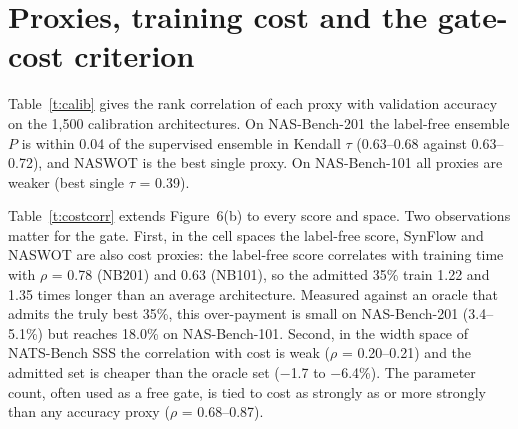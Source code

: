 \documentclass{sadhana}
\begin{document}
\begin{table}[tbp]
\caption{Power-law fit of the regret curve at a budget of 200 proposals: real evaluations $T$ (maximum over seeds), exponent $b$ with 95\% bootstrap interval, and simple regret $r_T$ (pt) at $T$.}\label{t:regretfit}
\centering\scriptsize
\setlength{\tabcolsep}{3.5pt}

\end{table}

\section{Proxies, training cost and the gate-cost criterion}\label{s:proxy}

Table~\ref{t:calib} gives the rank correlation of each proxy with validation accuracy on the 1,500 calibration architectures. On NAS-Bench-201 the label-free ensemble $P$ is within 0.04 of the supervised ensemble in Kendall $\tau$ (0.63--0.68 against 0.63--0.72), and NASWOT is the best single proxy. On NAS-Bench-101 all proxies are weaker (best single $\tau$ = 0.39).

\begin{table}[tbp]
\caption{Rank correlation of each zero-cost proxy with validation accuracy (Kendall $\tau$, Spearman $\rho$; 1,500 architectures, calibration seed 0). $C$ is a cost proxy and enters only the cost-penalised gates.}\label{t:calib}
\centering\footnotesize

\end{table}

Table~\ref{t:costcorr} extends Figure~6(b) to every score and space. Two observations matter for the gate. First, in the cell spaces the label-free score, SynFlow and NASWOT are also cost proxies: the label-free score correlates with training time with $\rho$ = 0.78 (NB201) and 0.63 (NB101), so the admitted 35\% train 1.22 and 1.35 times longer than an average architecture. Measured against an oracle that admits the truly best 35\%, this over-payment is small on NAS-Bench-201 (3.4--5.1\%) but reaches 18.0\% on NAS-Bench-101. Second, in the width space of NATS-Bench SSS the correlation with cost is weak ($\rho$ = 0.20--0.21) and the admitted set is cheaper than the oracle set ($-$1.7 to $-$6.4\%). The parameter count, often used as a free gate, is tied to cost as strongly as or more strongly than any accuracy proxy ($\rho$ = 0.68--0.87).

\begin{table}[tbp]
\caption{Correlation of every gate score with training time $\tau$ (Spearman $\rho$) and with validation accuracy $A$ (Kendall $\tau_K$) over the space (NB201: all 15,625 architectures; NB101 and NATS-SSS: 2,000 random architectures), mean training time of the top 35\% relative to the space average, excess of that cost over the oracle top 35\%, and mean validation accuracy of the admitted architectures.}\label{t:costcorr}
\centering\footnotesize

\end{table}
\end{document}

